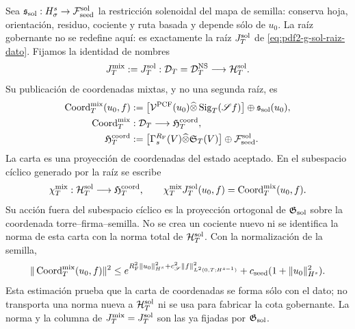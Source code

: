 Sea
$\mathfrak s_{\rm sol}:H^s_\sigma\to\mathcal F_{\rm seed}^{\rm sol}$ la
restricción solenoidal del mapa de semilla: conserva hoja, orientación, residuo,
cociente y ruta basada y depende sólo de $u_0$. La raíz gobernante no se
redefine aquí: es exactamente la raíz $J_T^{\rm sol}$ de
\eqref{eq:pdf2-g-sol-raiz-dato}. Fijamos la identidad de nombres
\begin{equation}\label{eq:pdf2-ns-root-identification}
 J_T^{\rm mix}:=J_T^{\rm sol}:
 \mathcal D_T=\mathcal D_T^{\rm NS}\longrightarrow\mathcal H_T^{\rm sol}.
\end{equation}
Su publicación de coordenadas mixtas, y no una segunda raíz, es
\begin{equation}\label{eq:pdf2-ns-root-map}
 \begin{aligned}
 \operatorname{Coord}_T^{\rm mix}(u_0,f)&:=
 \bigl[\mathcal V^{\rm PCF}(u_0)
 \widehat\otimes\operatorname{Sig}_T(\mathscr Sf)\bigr]
 \oplus\mathfrak s_{\rm sol}(u_0),\\
 \operatorname{Coord}_T^{\rm mix}&:\mathcal D_T\longrightarrow
 \mathfrak H_T^{\rm coord},\\
 \mathfrak H_T^{\rm coord}&:=
 \bigl[\Gamma_s^{R_{\rm F}}(V)
 \widehat\otimes\mathfrak S_T(V)\bigr]
 \oplus\mathcal F_{\rm seed}^{\rm sol}.
 \end{aligned}
\end{equation}
La carta es una proyección de coordenadas del estado aceptado. En el subespacio
cíclico generado por la raíz se escribe
\begin{equation}\label{eq:pdf2-ns-mixed-coordinate-chart}
 \chi_T^{\rm mix}:\mathcal H_T^{\rm sol}\longrightarrow
 \mathfrak H_T^{\rm coord},
 \qquad
 \chi_T^{\rm mix}J_T^{\rm sol}(u_0,f)
 =\operatorname{Coord}_T^{\rm mix}(u_0,f).
\end{equation}
Su acción fuera del subespacio cíclico es la proyección ortogonal de
$\mathfrak G_{\rm sol}$ sobre la coordenada torre--firma--semilla. No se crea
un cociente nuevo ni se identifica la norma de esta carta con la norma total
de $\mathcal H_T^{\rm sol}$.
Con la normalización de la semilla,
\begin{equation}\label{eq:pdf2-ns-root-norm}
 \|\operatorname{Coord}_T^{\rm mix}(u_0,f)\|^2
 \leq e^{R_{\rm F}^2\|u_0\|_{H^s}^2
             +c_{\mathscr S}^2\|f\|_{L^2(0,T;H^{s-1})}^2}
 +c_{\rm seed}(1+\|u_0\|_{H^s}^2).
\end{equation}
Esta estimación prueba que la carta de coordenadas se forma sólo con el dato;
no transporta una norma nueva a $\mathcal H_T^{\rm sol}$ ni se usa para fabricar
la cota gobernante. La norma y la columna de $J_T^{\rm mix}=J_T^{\rm sol}$ son
las ya fijadas por $\mathfrak G_{\rm sol}$.

